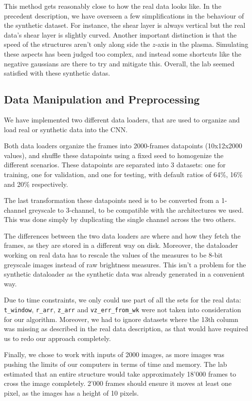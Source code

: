 \documentclass[10pt,conference]{IEEEtran}
\begin{document}
This method gets reasonably close to how the real data looks like. In the precedent description, we have overseen a few simplifications in the behaviour of the synthetic dataset. For instance, the shear layer is always vertical but the real data's shear layer is slightly curved. Another important distinction is that the speed of the structures aren't only along side the $z$-axis in the plasma. Simulating these aspects has been judged too complex, and instead some shortcuts like the negative gaussians are there to try and mitigate this. Overall, the lab seemed satisfied with these synthetic datas.
 


\subsection{Data Manipulation and Preprocessing}
We have implemented two different data loaders, that are used to organize and load real or synthetic data into the CNN.\par
Both data loaders organize the frames into 2000-frames datapoints (10x12x2000 values), and shuffle these datapoints using a fixed seed to homogenize the different scenarios. These datapoints are separated into 3 datasets: one for training, one for validation, and one for testing, with default ratios of 64\%, 16\% and 20\% respectively.\par
The last transformation these datapoints need is to be converted from a 1-channel greyscale to 3-channel, to be compatible with the architectures we used. This was done simply by duplicating the single channel across the two others.\par
The differences between the two data loaders are where and how they fetch the frames, as they are stored in a different way on disk. Moreover, the dataloader working on real data has to rescale the values of the measures to be 8-bit greyscale images instead of raw brightness measures. This isn't a problem for the synthetic dataloader as the synthetic data was already generated in a convenient way.

Due to time constraints, we only could use part of all the sets for the real data: \texttt{t\_window}, \texttt{r\_arr}, \texttt{z\_arr} and \texttt{vz\_err\_from\_wk} were not taken into consideration for our algorithm. Moreover, we had to ignore datasets where the 13th column was missing as described in the real data description, as that would have required us to redo our approach completely.\par
Finally, we chose to work with inputs of 2000 images, as more images was pushing the limits of our computers in terms of time and memory. The lab estimated that an entire structure would take approximately 18'000 frames to cross the image completely. 2'000 frames should ensure it moves at least one pixel, as the images has a height of 10 pixels.\par
\end{document}
